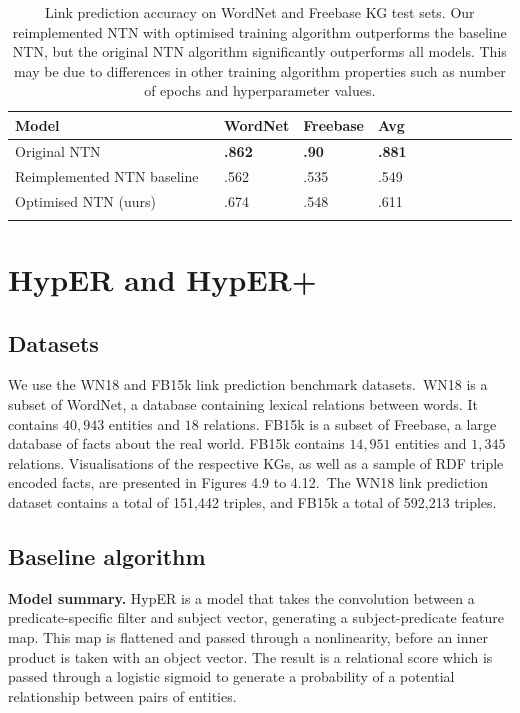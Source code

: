 \begin{table}[H]
	\centering
	\begin{tabular}{lllllllllll}
  		\textbf{Model} & \textbf{WordNet} & \textbf{Freebase} & \textbf{Avg} \\
  		\hline
  		Original NTN \unskip ~\citep{socher2013reasoning} & \textbf{.862} & \textbf{.90} & \textbf{.881} \\
  		Reimplemented NTN baseline  \unskip ~\citep{Doss2015} & .562 & .535 & .549 \\
  		\hline
  		Optimised NTN (uurs) & .674 & .548 & .611 \\
		&
	\end{tabular}
	\captionsetup{justification=centering}
	\caption{Link prediction accuracy on WordNet and Freebase KG test sets. Our reimplemented NTN with optimised training algorithm outperforms the baseline NTN, but the original NTN algorithm significantly outperforms all models. This may be due to differences in other training algorithm properties such as number of epochs and hyperparameter values.}
\end{table}



\section{HypER and HypER+}

\subsection{Datasets} 
We use the WN18\citep{bordes2013translating} and FB15k \citep{bordes2013translating} link prediction benchmark datasets.\ WN18 is a subset of WordNet, a database containing lexical relations between words. It contains $ 40, 943 $ entities and $ 18 $ relations. FB15k is a subset of Freebase, a large database of facts about the real world. FB15k contains $ 14, 951 $ entities and $ 1, 345 $ relations. Visualisations of the respective KGs, as well as a sample of RDF triple encoded facts, are presented in Figures 4.9 to 4.12.\ The WN18 link prediction dataset contains a total of 151,442 triples, and FB15k a total of 592,213 triples. 

\subsection{Baseline algorithm}
\textbf{Model summary.} HypER is a model that takes the convolution between a predicate-specific filter and subject vector, generating a subject-predicate feature map. This map is flattened and passed through a nonlinearity, before an inner product is taken with an object vector. The result is a relational score which is passed through a logistic sigmoid to generate a probability of a potential relationship between pairs of entities. \par

